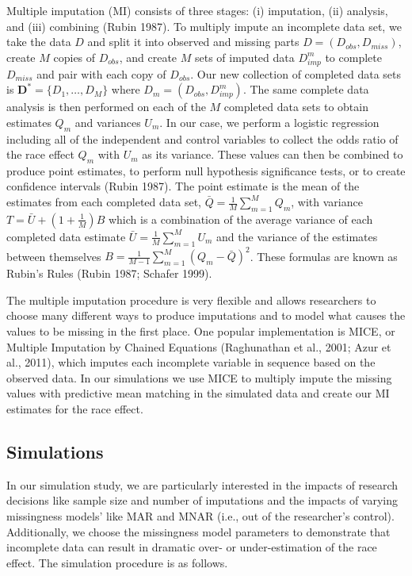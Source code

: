 \documentclass[titlepage]{article}
\begin{document}
Multiple imputation (MI) consists of three stages: (i) imputation, (ii) analysis, and
(iii) combining (Rubin 1987). To multiply impute an incomplete data set, we take the data \(D\) and split it into observed and missing parts \(D = (D_{obs}, D_{miss})\), create \(M\) copies of \(D_{obs}\), and create \(M\) sets of imputed data \(D_{imp}^m\) to complete \(D_{miss}\) and pair with each copy of \(D_{obs}\). Our new collection of completed data sets is \(\mathbf{D}^* = \{D_1,\dots, D_M\}\) where \(D_m = (D_{obs}, D_{imp}^m)\). The same complete data analysis is then performed on each of the \(M\) completed data sets to obtain estimates \(Q_m\) and variances \(U_m\). In our case, we perform a logistic regression including all of the independent and control variables to collect the odds ratio of the race effect \(Q_m\) with \(U_m\) as its variance. These values can then be combined to produce point estimates, to perform null hypothesis significance tests, or to create confidence intervals (Rubin 1987). The point estimate is the mean of the estimates from each completed data set, \(\bar{Q} = \frac{1}{M} \sum_{m=1}^M Q_m\), with variance \(T = \bar{U} + (1 + \frac{1}{M})B\) which is a combination of the average variance of each completed data estimate \(\bar{U} = \frac{1}{M}\sum_{m=1}^M U_m\) and the variance of the estimates between themselves \(B = \frac{1}{M-1}\sum_{m=1}^M (Q_m - \bar{Q})^2\). These formulas are known as Rubin's Rules (Rubin 1987; Schafer 1999).

The multiple imputation procedure is very flexible and allows researchers to choose many different ways to produce imputations and to model what causes the values to be missing in the first place. One popular implementation is MICE, or Multiple Imputation by Chained Equations (Raghunathan et al., 2001; Azur et al., 2011), which imputes each incomplete variable in sequence based on the observed data. In our simulations we  use MICE to multiply impute the missing values with predictive mean matching in the simulated data and create our MI estimates for the race effect.

\subsection{Simulations}

In our simulation study, we are particularly interested in the impacts of research decisions like sample size and number of imputations and the impacts of varying missingness models’ like MAR and MNAR (i.e., out of the researcher’s control). Additionally, we choose the missingness model parameters to demonstrate that incomplete data can result in dramatic over- or under-estimation of the race effect. The simulation procedure is as follows.
\end{document}
